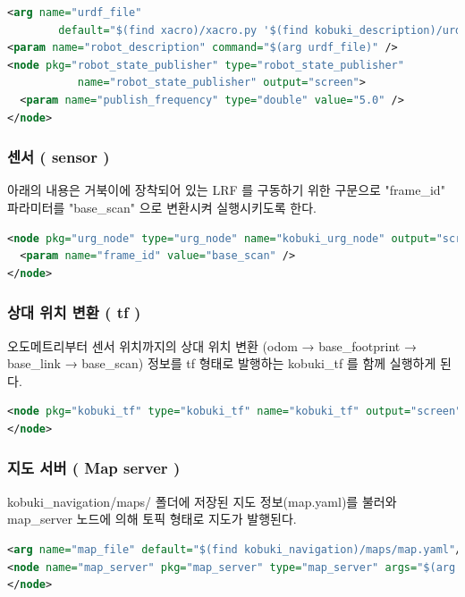 \vspace{\baselineskip}
\begin{lstlisting}[language=XML]
<arg name="urdf_file" 
        default="$(find xacro)/xacro.py '$(find kobuki_description)/urdf/kobuki_standalone.urdf.xacro'" />
<param name="robot_description" command="$(arg urdf_file)" />
<node pkg="robot_state_publisher" type="robot_state_publisher" 
           name="robot_state_publisher" output="screen">
  <param name="publish_frequency" type="double" value="5.0" />
</node>
\end{lstlisting}

\subsubsection{센서 ( sensor )}
아래의 내용은 거북이에 장착되어 있는 LRF 를 구동하기 위한 구문으로 "frame\_id" 파라미터를 "base\_scan" 으로 변환시켜 실행시키도록 한다.

\vspace{\baselineskip}
\begin{lstlisting}[language=XML]
<node pkg="urg_node" type="urg_node" name="kobuki_urg_node" output="screen">
  <param name="frame_id" value="base_scan" />
</node>
\end{lstlisting}

\subsubsection{상대 위치 변환 ( tf )}
오도메트리부터 센서 위치까지의 상대 위치 변환 (odom → base\_footprint → base\_link → base\_scan) 정보를 tf 형태로 발행하는 kobuki\_tf 를 함께 실행하게 된다.

\vspace{\baselineskip}
\begin{lstlisting}[language=XML]
<node pkg="kobuki_tf" type="kobuki_tf" name="kobuki_tf" output="screen">
</node>
\end{lstlisting}

\subsubsection{지도 서버 ( Map server )}
kobuki\_navigation/maps/ 폴더에 저장된 지도 정보(map.yaml)를 불러와 map\_server 노드에 의해 토픽 형태로 지도가 발행된다.

\vspace{\baselineskip}
\begin{lstlisting}[language=XML]
<arg name="map_file" default="$(find kobuki_navigation)/maps/map.yaml"/>
<node name="map_server" pkg="map_server" type="map_server" args="$(arg map_file)">
</node>
\end{lstlisting}

